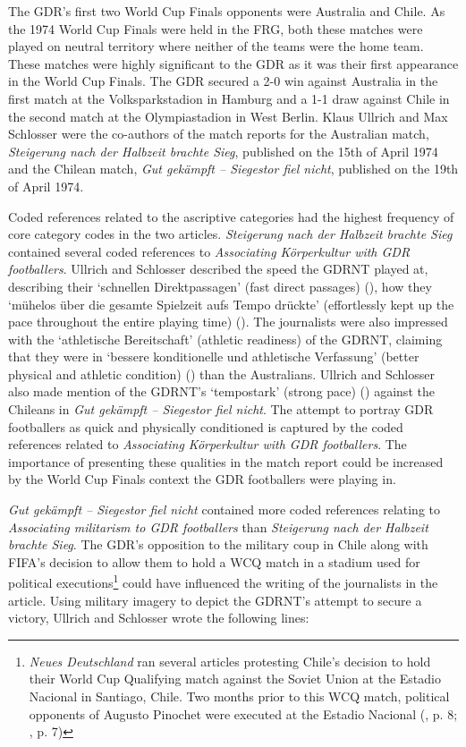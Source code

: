 The GDR’s first two World Cup Finals opponents were Australia and Chile. As the 1974 World Cup Finals were held in the FRG, both these matches were played on neutral territory where neither of the teams were the home team. These matches were highly significant to the GDR as it was their first appearance in the World Cup Finals. The GDR secured a 2-0 win against Australia in the first match at the Volksparkstadion in Hamburg and a 1-1 draw against Chile in the second match at the Olympiastadion in West Berlin. Klaus Ullrich and Max Schlosser were the co-authors of the match reports for the Australian match, \textit{Steigerung nach der Halbzeit brachte Sieg}, published on the 15th of April 1974 and the Chilean match, \textit{Gut gekämpft – Siegestor fiel nicht}, published on the 19th of April 1974.

Coded references related to the ascriptive categories had the highest frequency of core category codes in the two articles. \textit{Steigerung nach der Halbzeit brachte Sieg} contained several coded references to \textit{Associating Körperkultur with GDR footballers}. Ullrich and Schlosser described the speed the GDRNT played at, describing their ‘schnellen Direktpassagen’ (fast direct passages) (\cite{nd19740615}), how they ‘mühelos über die gesamte Spielzeit aufs Tempo drückte’ (effortlessly kept up the pace throughout the entire playing time) (\cite{nd19740615}). The journalists were also impressed with the ‘athletische Bereitschaft’ (athletic readiness) of the GDRNT, claiming that they were in ‘bessere konditionelle und athletische Verfassung’ (better physical and athletic condition) (\cite{nd19740615}) than the Australians. Ullrich and Schlosser also made mention of the GDRNT’s ‘tempostark’ (strong pace) (\cite{nd19740619}) against the Chileans in \textit{Gut gekämpft – Siegestor fiel nicht}. The attempt to portray GDR footballers as quick and physically conditioned is captured by the coded references related to \textit{Associating Körperkultur with GDR footballers}. The importance of presenting these qualities in the match report could be increased by the World Cup Finals context the GDR footballers were playing in.

\textit{Gut gekämpft – Siegestor fiel nicht} contained more coded references relating to \textit{Associating militarism to GDR footballers} than \textit{Steigerung nach der Halbzeit brachte Sieg}. The GDR’s opposition to the military coup in Chile along with FIFA’s decision to allow them to hold a WCQ match in a stadium used for political executions\footnote{\textit{Neues Deutschland} ran several articles protesting Chile’s decision to hold their World Cup Qualifying match against the Soviet Union at the Estadio Nacional in Santiago, Chile. Two months prior to this WCQ match, political opponents of Augusto Pinochet were executed at the Estadio Nacional (\cite{nd19731104a}, p. 8; \cite{nd19731112}, p. 7)} could have influenced the writing of the journalists in the article. Using military imagery to depict the GDRNT’s attempt to secure a victory, Ullrich and Schlosser wrote the following lines:

